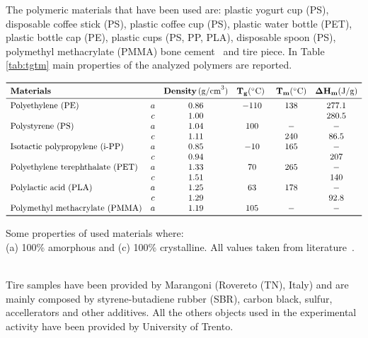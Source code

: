 \documentclass[a4paper, 11pt]{article}
\begin{document}
The polymeric materials that have been used are: plastic yogurt cup (PS), disposable coffee stick (PS), plastic coffee cup (PS), plastic water bottle (PET), plastic bottle cap (PE), plastic cups (PS, PP, PLA), disposable spoon (PS), polymethyl methacrylate (PMMA) bone cement~\cite{gruppo1} and tire piece. In Table \ref{tab:tgtm} main properties of the analyzed polymers are reported. 
\begin{table}[htp]
	\centering
	$
	\begin{array}{lccccc}
	\toprule
	\textbf{Materials} & & \mathbf{Density}\, (\text{g/cm}^3)  & \mathbf{T_{g}} (^\circ\text{C}) \ & \mathbf{T_{m}}(^\circ\text{C}) & \bm{\Delta} \mathbf{H_m} (\text{J/g}) \\
	\midrule
	\text{Polyethylene (PE)} & a & 0.86 & -110 & 138 & 277.1\\
	& c & 1.00 & & & 280.5 \\
	\text{Polystyrene (PS)} & a & 1.04& 100 & - & -  \\
	& c & 1.11 & & 240 & 86.5 \\
	\text{Isotactic polypropylene (i-PP)} & a & 0.85 & -10  & 165  & -\\
	& c & 0.94 & & & 207 \\
	\text{Polyethylene terephthalate (PET)} & a & 1.33 & 70 & 265 & - \\
	& c & 1.51 & & & 140 \\
	\text{Polylactic acid (PLA)} & a & 1.25 & 63 & 178 & -\\
	& c & 1.29 & & & 92.8 \\
	\text{Polymethyl methacrylate (PMMA)} & a & 1.19 & 105  & - & -\\
	\bottomrule
	\end{array}
	$
	\caption{Some properties of used materials where: \\ (a) 100\% amorphous and (c) 100\% crystalline. All values taken from literature~\cite{handbook}.}
	\label{tab:tgtm}
\end{table}\\
Tire samples have been provided by Marangoni (Rovereto (TN), Italy) and are mainly composed by styrene-butadiene rubber (SBR), carbon black, sulfur, accellerators and other additives. All the others objects used in the experimental activity have been provided by University of Trento. \par
\end{document}
